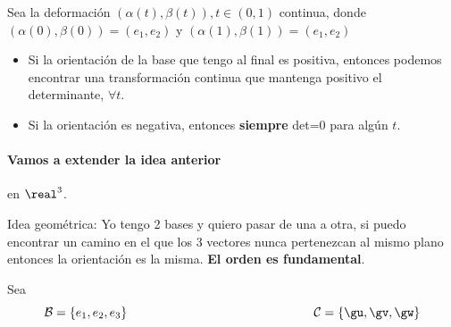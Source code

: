 Sea la deformación $(\alpha(t),\beta(t)), t\in(0,1)$ continua, donde $(\alpha(0),\beta(0)) = (e_1,e_2)$ y $(\alpha(1),\beta(1)) = (e_1,e_2)$

\begin{itemize}
\item
Si la orientación de la base que tengo al final es positiva, entonces podemos encontrar una transformación continua que mantenga positivo el determinante, $\forall t$.
\item
Si la orientación es negativa, entonces \textbf{siempre} det=0 para algún $t$.
\end{itemize}

\paragraph{Vamos a extender la idea anterior} en $\real^3$.

Idea geométrica: Yo tengo 2 bases y quiero pasar de una a otra, si puedo encontrar un camino en el que los 3 vectores nunca pertenezcan al mismo plano entonces la orientación es la misma. \textbf{El orden es fundamental}.

Sea
\[\mathcal{B} = \{e_1,e_2,e_3\} \hspace*{150pt} \mathcal{C} = \{\gu,\gv,\gw\}\]


\hspace*{50pt}
\hspace*{100pt}


